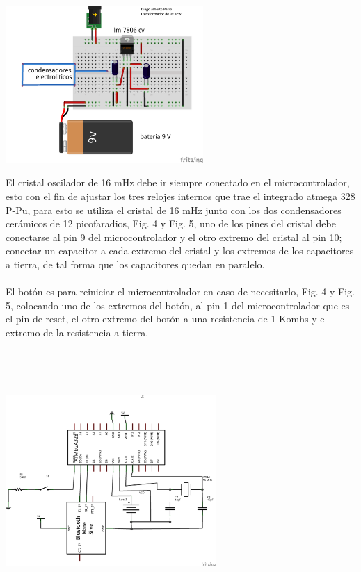 \documentclass[12pt]{article}
\newenvironment{Figure}
{\par\medskip\noindent\minipage{\linewidth}}
{\endminipage\par\medskip}
\begin{document}
\begin{multicols}{2}
\begin{Figure}
\center
\includegraphics[width=7.cm, height=6cm]{fig/montajetr5V.png}
\label{fig:g3}
\end{Figure}
\vspace{0.2cm}


El cristal oscilador de 16 mHz debe ir siempre conectado en el microcontrolador, esto  con el fin de ajustar los tres relojes internos que trae el integrado atmega 328 P-Pu, para esto se utiliza el cristal de 16 mHz junto con los dos condensadores cerámicos de 12 picofaradios, Fig. 4 y Fig. 5,  uno de los pines del cristal debe conectarse al pin 9 del microcontrolador y el otro extremo del cristal al pin 10; conectar un capacitor a cada extremo del cristal y los extremos de los capacitores a tierra, de tal forma que los capacitores quedan en paralelo. 
\\ \\
El botón es para reiniciar el microcontrolador en caso de necesitarlo, Fig. 4 y Fig. 5, colocando uno de los extremos del botón, al pin 1 del microcontrolador que es el pin de reset, el otro extremo del botón a una resistencia de 1 Komhs y el extremo de la resistencia a tierra.
\\ \\

\begin{Figure}
\center
\includegraphics[width=8cm, height=9cm]{fig/bluetoothesq.png} 
\label{fig:g4}
\end{Figure}
\vspace{1.4 cm}


\end{multicols}
\end{document}
